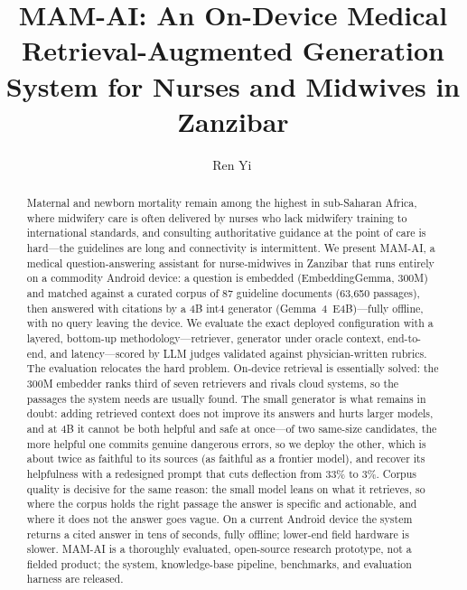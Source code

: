 \documentclass[acmsmall,nonacm]{acmart}
\title{MAM-AI: An On-Device Medical Retrieval-Augmented Generation System
for Nurses and Midwives in Zanzibar}
\author{Ren Yi\,\zhname}
\affiliation{%
  \institution{École Polytechnique Fédérale de Lausanne}
  \country{Switzerland \quad bonjour@renyi.ch}
}
\begin{document}
\begin{abstract}
Maternal and newborn mortality remain among the highest in sub-Saharan Africa,
where midwifery care is often delivered by nurses who lack midwifery training to
international standards, and consulting authoritative guidance at the point of
care is hard---the guidelines are long and connectivity is intermittent. We
present MAM-AI, a medical question-answering assistant for nurse-midwives in
Zanzibar that runs entirely on a commodity Android device: a question is embedded
(EmbeddingGemma, 300M) and matched against a curated corpus of 87 guideline
documents (63{,}650 passages), then answered with citations by a 4B int4
generator (Gemma~4~E4B)---fully offline, with no query leaving the device. We evaluate the exact deployed
configuration with a layered, bottom-up methodology---retriever, generator under
oracle context, end-to-end, and latency---scored by LLM judges validated against
physician-written rubrics. The evaluation relocates the hard problem. On-device retrieval is essentially solved: the 300M
embedder ranks third of seven retrievers and rivals cloud systems, so the
passages the system needs are usually found. The small generator is what remains
in doubt: adding retrieved context does not improve its answers and hurts larger
models, and at 4B it cannot be both helpful and safe at once---of two same-size
candidates, the more helpful one commits genuine dangerous errors, so we deploy
the other, which is about twice as faithful to its sources (as faithful as a
frontier model), and recover its helpfulness with a redesigned prompt that cuts
deflection from 33\% to 3\%. Corpus quality is decisive for the same reason: the
small model leans on what it retrieves, so where the corpus holds the right
passage the answer is specific and actionable, and where it does not the answer
goes vague. On a current Android device the system returns a cited answer in tens of
seconds, fully offline; lower-end field hardware is slower. MAM-AI is a
thoroughly evaluated, open-source research prototype, not a fielded product; the
system, knowledge-base pipeline, benchmarks, and evaluation harness are released.
\end{abstract}


\maketitle
\end{document}
